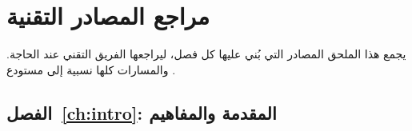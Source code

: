 \chapter{مراجع المصادر التقنية}
\label{app:sources}

يجمع هذا الملحق المصادر التي بُني عليها كل فصل، ليراجعها الفريق التقني عند الحاجة.
والمسارات كلها نسبية إلى مستودع \kos.

\newcommand{\srcs}[1]{\LR{\parbox[t]{9.9cm}{\raggedright\footnotesize\ttfamily #1}}}

\section{الفصل~\ref{ch:intro}: المقدمة والمفاهيم}

